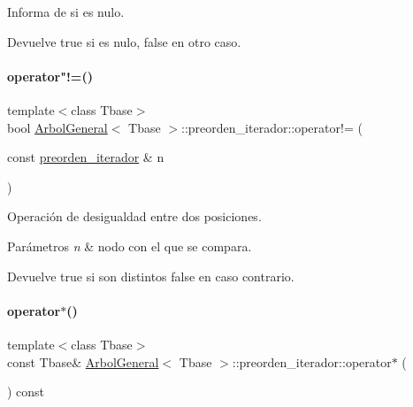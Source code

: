 Informa de si es nulo. 

\begin{DoxyReturn}{Devuelve}
true si es nulo, false en otro caso. 
\end{DoxyReturn}
\hypertarget{classArbolGeneral_1_1preorden__iterador_a10082c5dc98b2878518a8d49032056a7}{}\label{classArbolGeneral_1_1preorden__iterador_a10082c5dc98b2878518a8d49032056a7} 
\paragraph{\texorpdfstring{operator"!=()}{operator!=()}}
{\footnotesize\ttfamily template$<$class Tbase$>$ \\
bool \hyperlink{classArbolGeneral}{Arbol\+General}$<$ Tbase $>$\+::preorden\+\_\+iterador\+::operator!= (\begin{DoxyParamCaption}\item[{const \hyperlink{classArbolGeneral_1_1preorden__iterador}{preorden\+\_\+iterador} \&}]{n }\end{DoxyParamCaption})\hspace{0.3cm}{\ttfamily [inline]}}



Operación de desigualdad entre dos posiciones. 


\begin{DoxyParams}{Parámetros}
{\em n} & nodo con el que se compara. \\
\hline
\end{DoxyParams}
\begin{DoxyReturn}{Devuelve}
true si son distintos false en caso contrario. 
\end{DoxyReturn}
\hypertarget{classArbolGeneral_1_1preorden__iterador_a35a1c5648f0bef4c687eeaa742fd98f7}{}\label{classArbolGeneral_1_1preorden__iterador_a35a1c5648f0bef4c687eeaa742fd98f7} 
\paragraph{\texorpdfstring{operator$\ast$()}{operator*()}\hspace{0.1cm}{\footnotesize\ttfamily [1/2]}}
{\footnotesize\ttfamily template$<$class Tbase$>$ \\
const Tbase\& \hyperlink{classArbolGeneral}{Arbol\+General}$<$ Tbase $>$\+::preorden\+\_\+iterador\+::operator$\ast$ (\begin{DoxyParamCaption}{ }\end{DoxyParamCaption}) const\hspace{0.3cm}{\ttfamily [inline]}}



